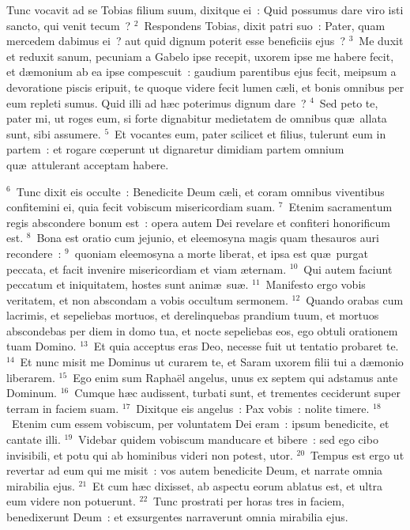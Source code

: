 \lettrine[lines=10,image=true,loversize=0.05,lraise=-0.03]{T}{}unc vocavit ad se Tobias filium suum, dixitque ei~: Quid possumus dare viro isti sancto, qui venit tecum~?
${}^{2}$~Respondens Tobias, dixit patri suo~: Pater, quam mercedem dabimus ei~? aut quid dignum poterit esse beneficiis ejus~?
${}^{3}$~Me duxit et reduxit sanum, pecuniam a Gabelo ipse recepit, uxorem ipse me habere fecit, et d\ae monium ab ea ipse compescuit~: gaudium parentibus ejus fecit, meipsum a devoratione piscis eripuit, te quoque videre fecit lumen c\ae li, et bonis omnibus per eum repleti sumus. Quid illi ad h\ae c poterimus dignum dare~?
${}^{4}$~Sed peto te, pater mi, ut roges eum, si forte dignabitur medietatem de omnibus qu\ae\ allata sunt, sibi assumere.
${}^{5}$~Et vocantes eum, pater scilicet et filius, tulerunt eum in partem~: et rogare cœperunt ut dignaretur dimidiam partem omnium qu\ae\ attulerant acceptam habere.


${}^{6}$~Tunc dixit eis occulte~: Benedicite Deum c\ae li, et coram omnibus viventibus confitemini ei, quia fecit vobiscum misericordiam suam.
${}^{7}$~Etenim sacramentum regis abscondere bonum est~: opera autem Dei revelare et confiteri honorificum est.
${}^{8}$~Bona est oratio cum jejunio, et eleemosyna magis quam thesauros auri recondere~:
${}^{9}$~quoniam eleemosyna a morte liberat, et ipsa est qu\ae\ purgat peccata, et facit invenire misericordiam et viam \ae ternam.
${}^{10}$~Qui autem faciunt peccatum et iniquitatem, hostes sunt anim\ae\ su\ae .
${}^{11}$~Manifesto ergo vobis veritatem, et non abscondam a vobis occultum sermonem.
${}^{12}$~Quando orabas cum lacrimis, et sepeliebas mortuos, et derelinquebas prandium tuum, et mortuos abscondebas per diem in domo tua, et nocte sepeliebas eos, ego obtuli orationem tuam Domino.
${}^{13}$~Et quia acceptus eras Deo, necesse fuit ut tentatio probaret te.
${}^{14}$~Et nunc misit me Dominus ut curarem te, et Saram uxorem filii tui a d\ae monio liberarem.
${}^{15}$~Ego enim sum Rapha\"el angelus, unus ex septem qui adstamus ante Dominum.
${}^{16}$~Cumque h\ae c audissent, turbati sunt, et trementes ceciderunt super terram in faciem suam.
${}^{17}$~Dixitque eis angelus~: Pax vobis~: nolite timere.
${}^{18}$~Etenim cum essem vobiscum, per voluntatem Dei eram~: ipsum benedicite, et cantate illi.
${}^{19}$~Videbar quidem vobiscum manducare et bibere~: sed ego cibo invisibili, et potu qui ab hominibus videri non potest, utor.
${}^{20}$~Tempus est ergo ut revertar ad eum qui me misit~: vos autem benedicite Deum, et narrate omnia mirabilia ejus.
${}^{21}$~Et cum h\ae c dixisset, ab aspectu eorum ablatus est, et ultra eum videre non potuerunt.
${}^{22}$~Tunc prostrati per horas tres in faciem, benedixerunt Deum~: et exsurgentes narraverunt omnia mirabilia ejus.

